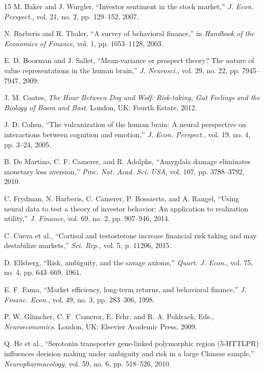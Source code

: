 \documentclass[conference]{IEEEtran}
\begin{document}
\begin{thebibliography}{15}
M. Baker and J. Wurgler, ``Investor sentiment in the stock market,'' \textit{J. Econ. Perspect.}, vol. 21, no. 2, pp. 129--152, 2007.

N. Barberis and R. Thaler, ``A survey of behavioral finance,'' in \textit{Handbook of the Economics of Finance}, vol. 1, pp. 1053--1128, 2003.

E. D. Boorman and J. Sallet, ``Mean-variance or prospect theory? The nature of value representations in the human brain,'' \textit{J. Neurosci.}, vol. 29, no. 22, pp. 7945--7947, 2009.

J. M. Coates, \textit{The Hour Between Dog and Wolf: Risk-taking, Gut Feelings and the Biology of Boom and Bust}. London, UK: Fourth Estate, 2012.

J. D. Cohen, ``The vulcanization of the human brain: A neural perspective on interactions between cognition and emotion,'' \textit{J. Econ. Perspect.}, vol. 19, no. 4, pp. 3--24, 2005.

B. De Martino, C. F. Camerer, and R. Adolphs, ``Amygdala damage eliminates monetary loss aversion,'' \textit{Proc. Nat. Acad. Sci. USA}, vol. 107, pp. 3788--3792, 2010.

C. Frydman, N. Barberis, C. Camerer, P. Bossaerts, and A. Rangel, ``Using neural data to test a theory of investor behavior: An application to realization utility,'' \textit{J. Finance}, vol. 69, no. 2, pp. 907--946, 2014.


C. Cueva et al., ``Cortisol and testosterone increase financial risk taking and may destabilize markets,'' \textit{Sci. Rep.}, vol. 5, p. 11206, 2015.

D. Ellsberg, ``Risk, ambiguity, and the savage axioms,'' \textit{Quart. J. Econ.}, vol. 75, no. 4, pp. 643--669, 1961.

E. F. Fama, ``Market efficiency, long-term returns, and behavioral finance,'' \textit{J. Financ. Econ.}, vol. 49, no. 3, pp. 283--306, 1998.

P. W. Glimcher, C. F. Camerer, E. Fehr, and R. A. Poldrack, Eds., \textit{Neuroeconomics}. London, UK: Elsevier Academic Press, 2009.

Q. He et al., ``Serotonin transporter gene-linked polymorphic region (5-HTTLPR) influences decision making under ambiguity and risk in a large Chinese sample,'' \textit{Neuropharmacology}, vol. 59, no. 6, pp. 518--526, 2010.



\end{thebibliography}
\end{document}
